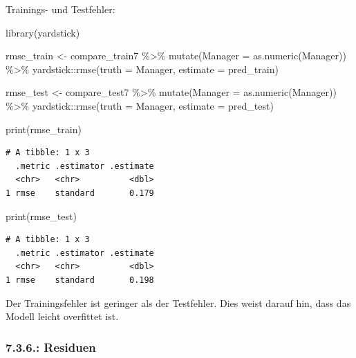 \documentclass[
  letterpaper,
  DIV=11,
  numbers=noendperiod]{scrartcl}
\newenvironment{Shaded}{\begin{snugshade}}{\end{snugshade}}
\newcommand{\AttributeTok}[1]{\textcolor[rgb]{0.40,0.45,0.13}{#1}}
\newcommand{\FunctionTok}[1]{\textcolor[rgb]{0.28,0.35,0.67}{#1}}
\newcommand{\NormalTok}[1]{\textcolor[rgb]{0.00,0.23,0.31}{#1}}
\newcommand{\OtherTok}[1]{\textcolor[rgb]{0.00,0.23,0.31}{#1}}
\newcommand{\SpecialCharTok}[1]{\textcolor[rgb]{0.37,0.37,0.37}{#1}}
\begin{document}
Trainings- und Testfehler:

\begin{Shaded}
\begin{Highlighting}[]
\FunctionTok{library}\NormalTok{(yardstick)}

\NormalTok{rmse\_train }\OtherTok{\textless{}{-}}\NormalTok{ compare\_train7 }\SpecialCharTok{\%\textgreater{}\%}
  \FunctionTok{mutate}\NormalTok{(}\AttributeTok{Manager =} \FunctionTok{as.numeric}\NormalTok{(Manager)) }\SpecialCharTok{\%\textgreater{}\%} 
\NormalTok{  yardstick}\SpecialCharTok{::}\FunctionTok{rmse}\NormalTok{(}\AttributeTok{truth =}\NormalTok{ Manager, }\AttributeTok{estimate =}\NormalTok{ pred\_train)}

\NormalTok{rmse\_test }\OtherTok{\textless{}{-}}\NormalTok{ compare\_test7 }\SpecialCharTok{\%\textgreater{}\%}
  \FunctionTok{mutate}\NormalTok{(}\AttributeTok{Manager =} \FunctionTok{as.numeric}\NormalTok{(Manager)) }\SpecialCharTok{\%\textgreater{}\%} 
\NormalTok{  yardstick}\SpecialCharTok{::}\FunctionTok{rmse}\NormalTok{(}\AttributeTok{truth =}\NormalTok{ Manager, }\AttributeTok{estimate =}\NormalTok{ pred\_test)}

\FunctionTok{print}\NormalTok{(rmse\_train)}
\end{Highlighting}
\end{Shaded}

\begin{verbatim}
# A tibble: 1 x 3
  .metric .estimator .estimate
  <chr>   <chr>          <dbl>
1 rmse    standard       0.179
\end{verbatim}

\begin{Shaded}
\begin{Highlighting}[]
\FunctionTok{print}\NormalTok{(rmse\_test)}
\end{Highlighting}
\end{Shaded}

\begin{verbatim}
# A tibble: 1 x 3
  .metric .estimator .estimate
  <chr>   <chr>          <dbl>
1 rmse    standard       0.198
\end{verbatim}

Der Trainingsfehler ist geringer als der Testfehler. Dies weist darauf
hin, dass das Modell leicht overfittet ist.

\hypertarget{residuen-2}{%
\subsubsection{7.3.6.: Residuen}\label{residuen-2}}
\end{document}
